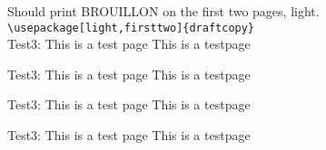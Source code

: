 \documentclass[a4paper,french]{article}
\newcommand{\xx}{
Test3: This is a test page \thepage \vfill
This is a testpage \thepage \newpage
}
\begin{document}
Should print BROUILLON on the first two pages, light.\\
\verb|\usepackage[light,firsttwo]{draftcopy}|\\
\xx\xx\xx\xx
\end{document}

